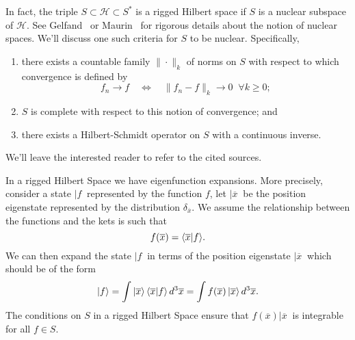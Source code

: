 \begin{ddanger}
In fact, the triple $S\subset\mathcal{H}\subset{S^{*}}$ is a
rigged Hilbert space if $S$ is a nuclear subspace of
$\mathcal{H}$. See Gelfand~\cite{gelfandgeneralized} or
Maurin~\cite{maurin} for rigorous details about the notion of
nuclear spaces. We'll discuss one such criteria for $S$ to be
nuclear. Specifically,
\begin{enumerate}
\item there exists a countable family $\|\cdot\|_{k}$ of norms on
$S$ with respect to which convergence is defined
by 
\begin{equation}
f_{n}\to{f}\quad\iff\quad\|f_{n}-f\|_{k}\to0\;\;\forall k\geq0;
\end{equation}
\item $S$ is complete with respect to this notion of
  convergence; and 
\item there exists a Hilbert-Schmidt operator on
  $S$ with a continuous inverse.
\end{enumerate}
We'll leave the interested reader to refer to the cited sources.
\end{ddanger}

In a rigged Hilbert Space we have eigenfunction expansions. More
precisely, consider a state $|f\>$ represented by the function
$f$, let $|\overline{x}\>$ be the position eigenstate represented
by the distribution $\delta_{\overline{x}}$. We assume the
relationship between the functions and the kets is such that
\begin{equation}%
f(\overline{x}) = \<\overline{x}|f\>.
\end{equation}
We can then expand the state $|f\>$ in terms of the position
eigenstate $|\overline{x}\>$ which should be of the form
\begin{equation}%
|f\> = \int |\overline{x}\>\,\<\overline{x}|f\>\,d^{3}\overline{x} = \int f(\overline{x})\,|\overline{x}\>\,d^{3}\overline{x}.
\end{equation}
The conditions on $S$ in a rigged Hilbert Space ensure that
$f(\overline{x})|\overline{x}\>$ is integrable for all $f\in{S}$.
